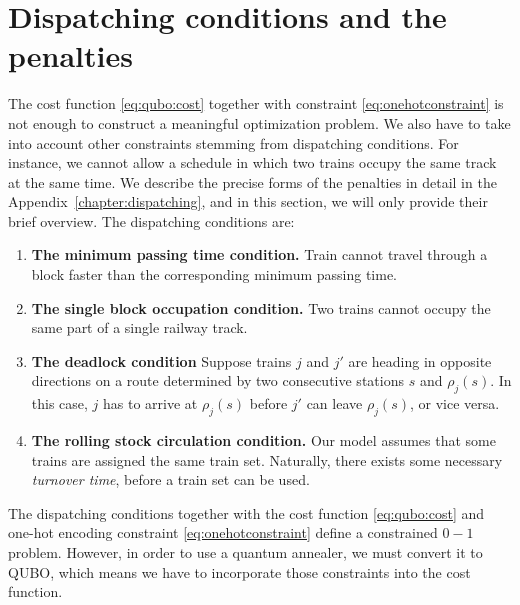 \section{Dispatching conditions and the penalties}
The cost function \eqref{eq:qubo:cost} together with constraint
\eqref{eq:onehotconstraint} is not enough to construct a meaningful
optimization problem. We also have to take into account other constraints
stemming from dispatching conditions. For instance, we cannot allow a schedule
in which two trains occupy the same track at the same time. We describe the
precise forms of the penalties in detail in the
Appendix~\ref{chapter:dispatching}, and in this section, we will only provide
their brief overview. The dispatching conditions are:
\begin{enumerate}
  \item \textbf{The minimum passing time condition.} Train cannot travel through a block faster than the corresponding minimum passing time.
  \item \textbf{The single block occupation condition.} Two trains cannot occupy the same part of a single railway track.
  \item \textbf{The deadlock condition} Suppose trains $j$ and $j'$ are
    heading in opposite directions on a route determined by two consecutive
    stations $s$ and $\rho_j(s)$. In this case, $j$ has to arrive at $\rho_j(s)$ before $j'$ can leave $\rho_j(s)$, or vice versa.
  \item \textbf{The rolling stock circulation condition.} Our model assumes that some trains are assigned the same train set. Naturally,
    there exists some necessary \emph{turnover time}, before a train set can be
    used.
\end{enumerate}

The dispatching conditions together with the cost function \eqref{eq:qubo:cost}
and one-hot encoding constraint \eqref{eq:onehotconstraint} define a
constrained $0-1$ problem. However, in order to use a quantum annealer, we must
convert it to QUBO, which means we have to incorporate those constraints into
the cost function.


